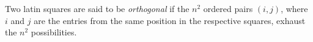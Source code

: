 Two latin squares are said to be \emph{orthogonal} if the $n^2$ ordered pairs $(i,j)$, where $i$ and $j$ are the entries from the same position in the respective squares, exhaust the $n^2$ possibilities.
